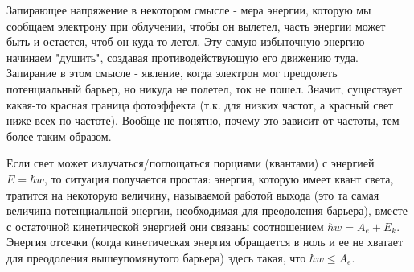  \par Запирающее напряжение в некотором смысле - мера энергии, которую мы сообщаем электрону при облучении, чтобы он вылетел, часть энергии может быть и остается, чтоб он куда-то летел. Эту самую избыточную энергию начинаем "душить", создавая противодействующую его движению туда. Запирание в этом смысле - явление, когда электрон мог преодолеть потенциальный барьер, но никуда не полетел, ток не пошел. Значит, существует какая-то красная граница фотоэффекта (т.к. для низких частот, а красный свет ниже всех по частоте). Вообще не понятно, почему это зависит от частоты, тем более таким образом.

\par Если свет может излучаться/поглощаться порциями (квантами) с энергией $E= \hbar w$, то ситуация получается простая: энергия, которую имеет квант света, тратится на некоторую величину, называемой работой выхода (это та самая величина потенциальной энергии, необходимая для преодоления барьера), вместе с остаточной кинетической энергией они связаны соотношением $\hbar w = A_e + E_k$. Энергия отсечки (когда кинетическая энергия обращается в ноль и ее не хватает для преодоления вышеупомянутого барьера) здесь такая, что $\hbar w \leq A_e $.
